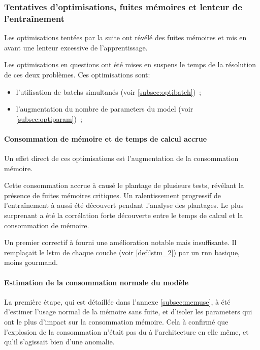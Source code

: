 \subsubsection{Tentatives d'optimisations, fuites mémoires et lenteur de l'entraînement}\label{subsec:optimem}

Les optimisations tentées par la suite ont révélé des fuites mémoires et mis en avant une lenteur excessive de l'apprentissage.

Les optimisations en questions ont été mises en suspens le temps de la résolution de ces deux problèmes.
Ces optimisations sont:
\begin{itemize}
	\item l'utilisation de \glspl{batch} simultanés (voir \autoref{subsec:optibatch})~; 
	\item l'augmentation du nombre de \glspl{parameter} du \gls{model} (voir \autoref{subsec:optiparam})~;
\end{itemize}

\paragraph{Consommation de mémoire et de temps de calcul accrue}
Un effet direct de ces optimisations est l'augmentation de la consommation mémoire.

Cette consommation accrue à causé le plantage de plusieurs tests, révélant la présence de fuites mémoires critiques.
Un ralentissement progressif de l'entraînement à aussi été découvert pendant l'analyse des plantages. %
Le plus surprenant a été la corrélation forte découverte entre le temps de calcul et la consommation de mémoire.

Un premier correctif à fourni une amélioration notable mais insuffisante.
Il remplaçait le \gls{lstm} de chaque couche (voir \autoref{def:lstm_2}) par un \gls{rnn} basique, moins gourmand. %

\paragraph{Estimation de la consommation normale du modèle}
La première étape, qui est détaillée dans l'annexe \ref{subsec:memuse}, à été d'estimer l'usage normal de la mémoire sans fuite, et d'isoler les \glspl{parameter} qui ont le plus d'impact sur la consommation mémoire.
Cela à confirmé que l'explosion de la consommation n'était pas du à l'architecture en elle même, et qu'il s'agissait bien d'une anomalie.

